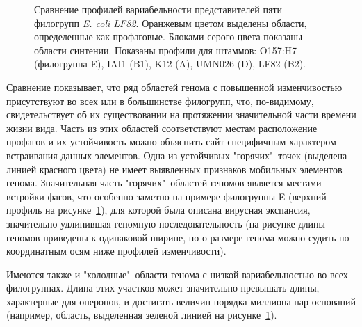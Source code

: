 \begin{figure}[!ht] 
    \center
    \setlength{\fboxsep}{10pt}%
    \setlength{\fboxrule}{0pt}%
    \caption{Сравнение профилей вариабельности представителей пяти филогрупп \textit{E. coli LF82}. Оранжевым цветом выделены области, определенные как профаговые. Блоками серого цвета показаны области синтении. Показаны профили для штаммов: O157:H7 (филогруппа E), IAI1 (B1), K12 (A), UMN026 (D), LF82 (B2). }
    \label{img:phylogroups_complex} 
  \end{figure}
  
  

Сравнение показывает, что ряд областей генома с повышенной изменчивостью присутствуют во всех или в большинстве филогрупп, что, по-видимому, свидетельствует об их существовании на протяжении значительной части времени жизни вида. Часть из этих областей соответствуют местам расположение профагов и их устойчивость можно объяснить сайт специфичным характером встраивания данных элементов. Одна из устойчивых "горячих"\ точек (выделена линией красного цвета) не имеет выявленных признаков мобильных элементов генома. Значительная часть "горячих"\ областей геномов является местами встройки фагов, что особенно заметно на примере филогруппы E (верхний профиль на рисунке~\ref{img:phylogroups_complex}), для которой была описана вирусная экспансия, значительно удлинившая геномную последовательность (на рисунке длины геномов приведены к одинаковой ширине, но о размере генома можно судить по координатным осям ниже профилей изменчивости).

Имеются также и "холодные"\ области генома с низкой вариабельностью во всех филогруппах. Длина этих участков может значительно превышать длины, характерные для оперонов, и достигать величин порядка миллиона пар оснований (например, область, выделенная зеленой линией на рисунке~\ref{img:phylogroups_complex}).

